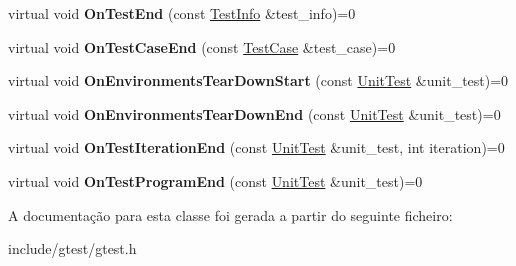 \begin{DoxyCompactItemize}
\item 
\hypertarget{classtesting_1_1TestEventListener_abb1c44525ef038500608b5dc2f17099b}{virtual void {\bfseries On\-Test\-End} (const \hyperlink{classtesting_1_1TestInfo}{Test\-Info} \&test\-\_\-info)=0}\label{classtesting_1_1TestEventListener_abb1c44525ef038500608b5dc2f17099b}

\item 
\hypertarget{classtesting_1_1TestEventListener_ae61985e2ef76ac78379b077be57a9c36}{virtual void {\bfseries On\-Test\-Case\-End} (const \hyperlink{classtesting_1_1TestCase}{Test\-Case} \&test\-\_\-case)=0}\label{classtesting_1_1TestEventListener_ae61985e2ef76ac78379b077be57a9c36}

\item 
\hypertarget{classtesting_1_1TestEventListener_a468b5e6701bcb86cb2c956caadbba5e4}{virtual void {\bfseries On\-Environments\-Tear\-Down\-Start} (const \hyperlink{classtesting_1_1UnitTest}{Unit\-Test} \&unit\-\_\-test)=0}\label{classtesting_1_1TestEventListener_a468b5e6701bcb86cb2c956caadbba5e4}

\item 
\hypertarget{classtesting_1_1TestEventListener_a9ea04fa7f447865ba76df35e12ba2092}{virtual void {\bfseries On\-Environments\-Tear\-Down\-End} (const \hyperlink{classtesting_1_1UnitTest}{Unit\-Test} \&unit\-\_\-test)=0}\label{classtesting_1_1TestEventListener_a9ea04fa7f447865ba76df35e12ba2092}

\item 
\hypertarget{classtesting_1_1TestEventListener_a550fdb3e55726e4cefa09f5697941425}{virtual void {\bfseries On\-Test\-Iteration\-End} (const \hyperlink{classtesting_1_1UnitTest}{Unit\-Test} \&unit\-\_\-test, int iteration)=0}\label{classtesting_1_1TestEventListener_a550fdb3e55726e4cefa09f5697941425}

\item 
\hypertarget{classtesting_1_1TestEventListener_ad15b6246d94c268e233487a86463ef3d}{virtual void {\bfseries On\-Test\-Program\-End} (const \hyperlink{classtesting_1_1UnitTest}{Unit\-Test} \&unit\-\_\-test)=0}\label{classtesting_1_1TestEventListener_ad15b6246d94c268e233487a86463ef3d}

\end{DoxyCompactItemize}


A documentação para esta classe foi gerada a partir do seguinte ficheiro\-:\begin{DoxyCompactItemize}
\item 
include/gtest/gtest.\-h\end{DoxyCompactItemize}
